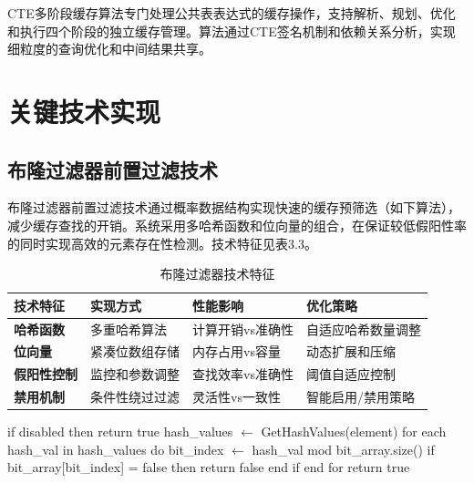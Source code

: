 CTE多阶段缓存算法专门处理公共表表达式的缓存操作，支持解析、规划、优化和执行四个阶段的独立缓存管理。算法通过CTE签名机制和依赖关系分析，实现细粒度的查询优化和中间结果共享。

\section{关键技术实现}

\subsection{布隆过滤器前置过滤技术}

布隆过滤器前置过滤技术通过概率数据结构实现快速的缓存预筛选（如下算法），减少缓存查找的开销。系统采用多哈希函数和位向量的组合，在保证较低假阳性率的同时实现高效的元素存在性检测。技术特征见表3.3。

\begin{table}[!htb]
    \caption{布隆过滤器技术特征}
    \label{table3_3}
    \centering
    \begin{tabular}{p{2.5cm}p{3cm}p{4cm}p{4cm}}
        \hline
        技术特征 & 实现方式 & 性能影响 & 优化策略 \\
        \hline
        \textbf{哈希函数} & 多重哈希算法 & 计算开销vs准确性 & 自适应哈希数量调整 \\
        \textbf{位向量} & 紧凑位数组存储 & 内存占用vs容量 & 动态扩展和压缩 \\
        \textbf{假阳性控制} & 监控和参数调整 & 查找效率vs准确性 & 阈值自适应控制 \\
        \textbf{禁用机制} & 条件性绕过过滤 & 灵活性vs一致性 & 智能启用/禁用策略 \\
        \hline
    \end{tabular}
\end{table}

\begin{algorithm}[htbp]
\caption{布隆过滤器存在性检测算法}
\label{alg3_3_5}
\begin{algorithmic}[1]
\STATE if disabled then return true 
\STATE hash\_values $\leftarrow$ GetHashValues(element) 
\STATE for each hash\_val in hash\_values do 
\STATE bit\_index $\leftarrow$ hash\_val mod bit\_array.size() 
\STATE if bit\_array[bit\_index] = false then 
\STATE return false 
\STATE end if
\STATE end for 
\STATE return true 
\end{algorithmic}
\end{algorithm}

